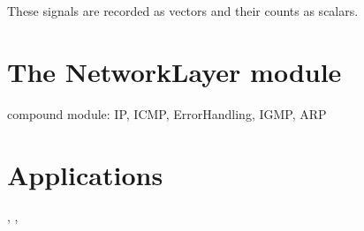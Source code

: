 These signals are recorded as vectors and their counts as scalars.


\section{The NetworkLayer module}

compound module: IP, ICMP, ErrorHandling, IGMP, ARP

\section{Applications}

, , 



